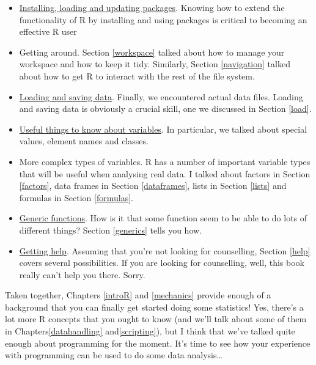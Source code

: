 \documentclass[
]{book}
\providecommand{\tightlist}{%
  \setlength{\itemsep}{0pt}\setlength{\parskip}{0pt}}
\begin{document}
\begin{itemize}
\tightlist
\item
  \protect\hyperlink{packageinstall}{Installing, loading and updating packages}. Knowing how to extend the functionality of R by installing and using packages is critical to becoming an effective R user
\item
  Getting around. Section \ref{workspace} talked about how to manage your workspace and how to keep it tidy. Similarly, Section \ref{navigation} talked about how to get R to interact with the rest of the file system.
\item
  \protect\hyperlink{load}{Loading and saving data}. Finally, we encountered actual data files. Loading and saving data is obviously a crucial skill, one we discussed in Section \ref{load}.
\item
  \protect\hyperlink{useful}{Useful things to know about variables}. In particular, we talked about special values, element names and classes.
\item
  More complex types of variables. R has a number of important variable types that will be useful when analysing real data. I talked about factors in Section \ref{factors}, data frames in Section \ref{dataframes}, lists in Section \ref{lists} and formulas in Section \ref{formulas}.
\item
  \protect\hyperlink{generics}{Generic functions}. How is it that some function seem to be able to do lots of different things? Section \ref{generics} tells you how.
\item
  \protect\hyperlink{help}{Getting help}. Assuming that you're not looking for counselling, Section \ref{help} covers several possibilities. If you are looking for counselling, well, this book really can't help you there. Sorry.
\end{itemize}

Taken together, Chapters \ref{introR} and \ref{mechanics} provide enough of a background that you can finally get started doing some statistics! Yes, there's a lot more R concepts that you ought to know (and we'll talk about some of them in Chapters\ref{datahandling} and\ref{scripting}), but I think that we've talked quite enough about programming for the moment. It's time to see how your experience with programming can be used to do some data analysis\ldots{}

  
\end{document}
